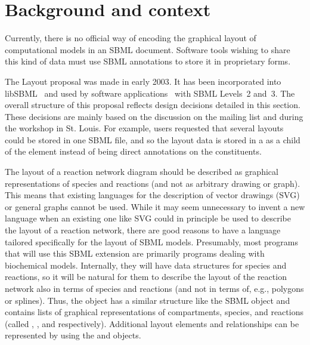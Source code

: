 \section{Background and context}
\label{background}

Currently, there is no official way of encoding the graphical layout of 
computational models in an SBML document. Software tools wishing to share this 
kind of data must use SBML annotations to store it
in proprietary forms.

The Layout proposal was made in early 2003.  It has been 
incorporated into libSBML~\citep{Gauges01082006} and used by 
software applications~\cite[e.g.,][]{COPASI, sbw} with SBML Levels~2 
and~3. The overall structure of this proposal reflects design decisions
detailed in this section. These decisions are mainly based on 
the discussion on the mailing list and during the workshop in St. Louis. 
For example, users requested that several layouts could be stored in one SBML file,
and so the layout data is stored in a \ListOfLayouts as a child of the 
\Model element instead of being direct annotations on the \Model constituents. 

The layout of a reaction network diagram should be described as 
graphical representations of species and reactions (and not as arbitrary 
drawing or graph). This means that existing languages for the 
description of vector drawings (SVG) or general graphs cannot be used. 
While it may seem unnecessary to invent a new language when an existing 
one like SVG could in principle be used to describe the layout of a 
reaction network, there are good reasons to have a language tailored 
specifically for the layout of SBML models. 
Presumably, most programs that will use this SBML extension are 
primarily programs dealing with biochemical models. Internally, they 
will have data structures for species and reactions, so it will be 
natural for them to describe the layout of the reaction network also in 
terms of species and reactions (and not in terms of, e.g., polygons or 
splines). Thus, the \LayoutClass object has a similar structure like 
the SBML \Model object and contains lists of graphical 
representations of compartments, species, and reactions (called 
\CompartmentGlyph, \SpeciesGlyph, and \ReactionGlyph 
respectively). Additional layout elements and relationships can be 
represented by using the \GraphicalObject and 
\GeneralGlyph objects.

